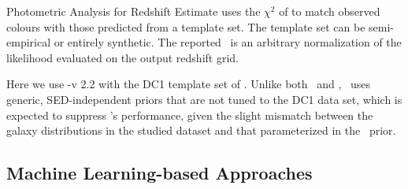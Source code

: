 
Photometric Analysis for Redshift Estimate \citep[\lephare,][]{arnouts_measuring_1999,ilbert_accurate_2006} uses the $\chi^2$ of  to match observed colours with those predicted from a template set.
The template set can be semi-empirical or entirely synthetic.
The reported \pzpdf\ is an arbitrary normalization of the likelihood evaluated on the output redshift grid.

Here we use \lephare-v 2.2 with the DC1 template set of .
Unlike both \bpz\ and \eazy, \lephare\ uses generic, SED-independent priors that are not tuned to the DC1 data set, which is expected to suppress \lephare's performance, given the slight mismatch between the galaxy distributions in the studied dataset and that parameterized in the \lephare\ prior.

\subsection{Machine Learning-based Approaches}

